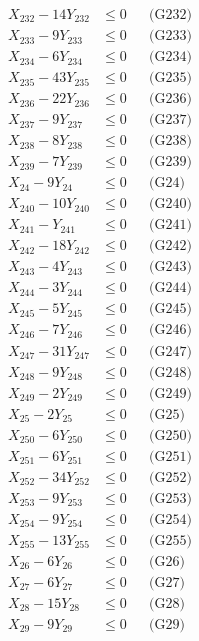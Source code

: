\documentclass[a4paper,10pt]{article}
\begin{document}
{\begin{align}
X_{232} - 14Y_{232} &\leq 0 && \text{(G232)} \\
X_{233} - 9Y_{233} &\leq 0 && \text{(G233)} \\
X_{234} - 6Y_{234} &\leq 0 && \text{(G234)} \\
X_{235} - 43Y_{235} &\leq 0 && \text{(G235)} \\
X_{236} - 22Y_{236} &\leq 0 && \text{(G236)} \\
X_{237} - 9Y_{237} &\leq 0 && \text{(G237)} \\
X_{238} - 8Y_{238} &\leq 0 && \text{(G238)} \\
X_{239} - 7Y_{239} &\leq 0 && \text{(G239)} \\
X_{24} - 9Y_{24} &\leq 0 && \text{(G24)} \\
X_{240} - 10Y_{240} &\leq 0 && \text{(G240)} \\
X_{241} - Y_{241} &\leq 0 && \text{(G241)} \\
\allowbreak
X_{242} - 18Y_{242} &\leq 0 && \text{(G242)} \\
X_{243} - 4Y_{243} &\leq 0 && \text{(G243)} \\
X_{244} - 3Y_{244} &\leq 0 && \text{(G244)} \\
X_{245} - 5Y_{245} &\leq 0 && \text{(G245)} \\
X_{246} - 7Y_{246} &\leq 0 && \text{(G246)} \\
X_{247} - 31Y_{247} &\leq 0 && \text{(G247)} \\
X_{248} - 9Y_{248} &\leq 0 && \text{(G248)} \\
X_{249} - 2Y_{249} &\leq 0 && \text{(G249)} \\
X_{25} - 2Y_{25} &\leq 0 && \text{(G25)} \\
X_{250} - 6Y_{250} &\leq 0 && \text{(G250)} \\
X_{251} - 6Y_{251} &\leq 0 && \text{(G251)} \\
X_{252} - 34Y_{252} &\leq 0 && \text{(G252)} \\
X_{253} - 9Y_{253} &\leq 0 && \text{(G253)} \\
X_{254} - 9Y_{254} &\leq 0 && \text{(G254)} \\
X_{255} - 13Y_{255} &\leq 0 && \text{(G255)} \\
X_{26} - 6Y_{26} &\leq 0 && \text{(G26)} \\
X_{27} - 6Y_{27} &\leq 0 && \text{(G27)} \\
X_{28} - 15Y_{28} &\leq 0 && \text{(G28)} \\
X_{29} - 9Y_{29} &\leq 0 && \text{(G29)} \\

\end{align}}
\end{document}
